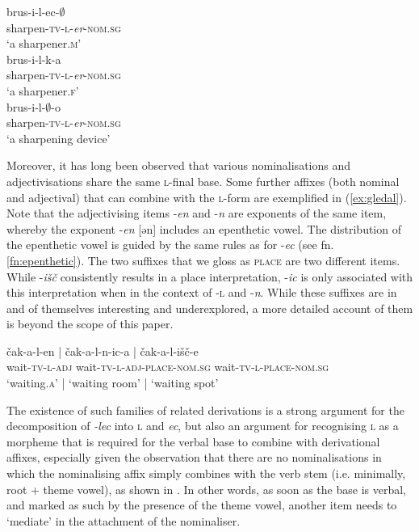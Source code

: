 \documentclass[output=paper,colorlinks,citecolor=brown]{langscibook}
\begin{document}
\ea \label{ex:brus}
\ea \glll brus-i-l-ec-$\emptyset$\\
sharpen-\textsc{tv}-\textsc{l}-\textit{er}-\textsc{nom.sg} \\
`a{ }sharpener.\textsc{m}'\\

\ex \glll brus-i-l-k-a \\
sharpen-\textsc{tv}-\textsc{l}-\textit{er}-\textsc{nom.sg}\\
`a{ }sharpener.\textsc{f}'\\


\ex \glll  brus-i-l-$\emptyset$-o  \\
  sharpen-\textsc{tv}-\textsc{l}-\textit{er}-\textsc{nom.sg}\\
 `a{ }sharpening{ }device' \\
\z \z 


\noindent Moreover, it has long been observed that various nominalisations and adjectivisations share the same \textsc{l}-final base. Some further affixes (both nominal and adjectival) that can combine with the \textsc{l}-form are exemplified in (\ref{ex:gledal}). Note that the adjectivising items -\textit{en} and -\textit{n} are exponents of the same item, whereby the exponent -\textit{en} [ən] includes an epenthetic vowel. The distribution of the epenthetic vowel is guided by the same rules as for -\textit{ec} (see fn. \ref{fn:epenthetic}). The two suffixes that we gloss as \textsc{place} are two different items. While -\textit{išč} consistently results in a place interpretation, -\textit{ic} is only associated with this interpretation when in the context of -\textsc{l} and -\textit{n}. While these suffixes are in and of themselves interesting and underexplored, a more detailed account of them is beyond the scope of this paper.   

\ea \label{ex:gledal}
\glll čak-a-l-en | čak-a-l-n-ic-a | čak-a-l-išč-e \\
wait-\textsc{tv}-\textsc{l}-\textsc{adj} {} wait-\textsc{tv}-\textsc{l}-\textsc{adj}-\textsc{place}-\textsc{nom.sg} {} wait-\textsc{tv}-\textsc{l}-\textsc{place}-\textsc{nom.sg}  \\
`waiting.\textsc{a}' | `waiting{ }room' | `waiting{ }spot'\\
\z %

\noindent The existence of such families of related derivations is a strong argument for the decomposition of \textit{-lec} into \textsc{l} and \textit{ec}, but also an argument for recognising \textsc{l} as a morpheme that is required for the verbal base to combine with derivational affixes, especially given the observation that there are no nominalisations in which the nominalising affix simply combines with the verb stem (i.e. minimally, root + theme vowel), as shown in . In other words, as soon as the base is verbal, and marked as such by the presence of the theme vowel, another item needs to `mediate' in the attachment of the nominaliser. 
 
\end{document}
